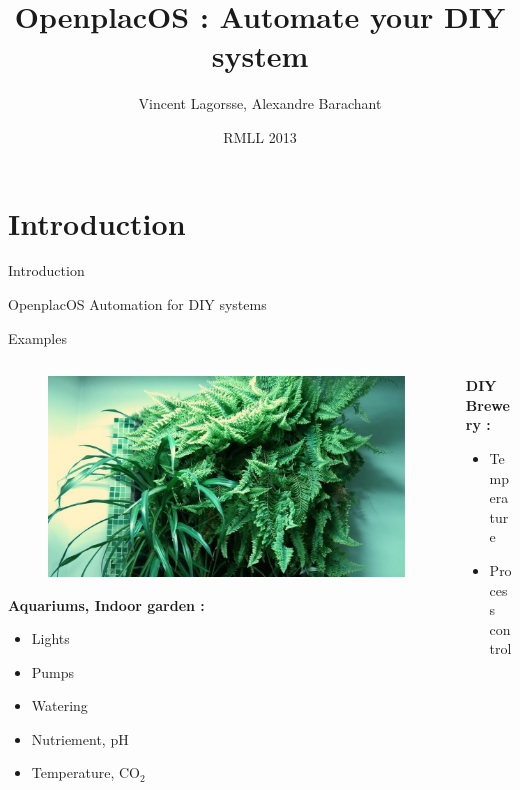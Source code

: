 \documentclass{beamer}
\title[P300 BCI without training]{OpenplacOS : Automate your DIY system}
\author[A. Barachant, V. Lagorsse]{Vincent Lagorsse, Alexandre Barachant}\institute{}
\date{RMLL 2013}
\begin{document}
{
\begin{frame}
  \titlepage
\end{frame}
}
\addtocounter{framenumber}{-1}

\section{Introduction}

\begin{frame}{Introduction}
\begin{block}{OpenplacOS}
Automation for DIY systems
\end{block}
\end{frame}

\begin{frame}{Examples}
\begin{columns}
\begin{column}[l]{0.5\textwidth}
\begin{figure}
\includegraphics[width=\columnwidth]{./figures/mur.jpg}
\end{figure}
\vfill
\textbf{Aquariums, Indoor garden :}
\begin{itemize}
\item Lights
\item Pumps
\item Watering
\item Nutriement, pH
\item Temperature, $\mathrm{CO}_2$
\end{itemize}
\end{column}
\begin{column}[r]{0.5\textwidth}
\textbf{DIY Brewery :}
\begin{itemize}
\item Temperature
\item Process control

\end{itemize}
\end{column}
\end{columns}
\end{frame}
\end{document}
